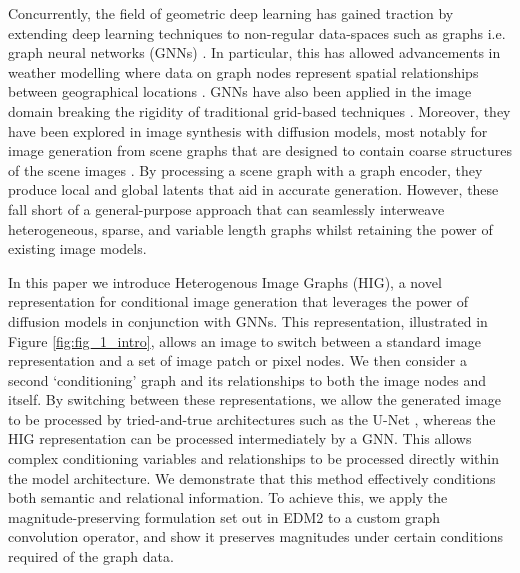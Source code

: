 

Concurrently, the field of geometric deep learning has gained  traction by extending deep learning techniques to non-regular data-spaces such as graphs i.e.  graph neural networks (GNNs) \cite{kipf_semi-supervised_2017, hamilton_inductive_2018, velickovic_graph_2018, gilmer_neural_2017}. In particular, this has allowed advancements in weather modelling where data on graph nodes represent spatial relationships between geographical locations \cite{lam_graphcast_2022}. GNNs have also been applied in the image domain breaking the rigidity of traditional grid-based techniques \cite{tian_image_nodate, han_vision_2022}. Moreover, they have been explored in image synthesis with diffusion models, most notably for image generation from scene graphs that are designed to contain coarse structures of the scene images \cite{farshad_scenegenie_2023, johnson_image_2018, yang_diffusion-based_2022}. By processing a scene graph with a graph encoder, they produce local and global latents that aid in accurate generation. However, these fall short of a general-purpose approach that can seamlessly interweave heterogeneous, sparse, and variable length graphs whilst retaining the power of existing image models.


In this paper we introduce Heterogenous Image Graphs (HIG), a novel representation for conditional image generation that leverages the power of diffusion models in conjunction with GNNs. This representation, illustrated in Figure \ref{fig:fig_1_intro}, allows an image to switch between a standard image representation and a set of image patch or pixel nodes. We then consider a second `conditioning' graph and its relationships to both the image nodes and itself. By switching between these representations, we allow the generated image to be processed by tried-and-true architectures such as the U-Net \cite{ronneberger_u-net_2015, karras_analyzing_2024}, whereas the HIG representation can be processed intermediately by a GNN. This allows complex conditioning variables and relationships to be processed directly within the model architecture. We demonstrate that this method effectively conditions both semantic and relational information. To achieve this, we apply the magnitude-preserving formulation set out in EDM2 \cite{karras_analyzing_2024} to a custom graph convolution operator, and show it preserves magnitudes under certain conditions required of the graph data.

